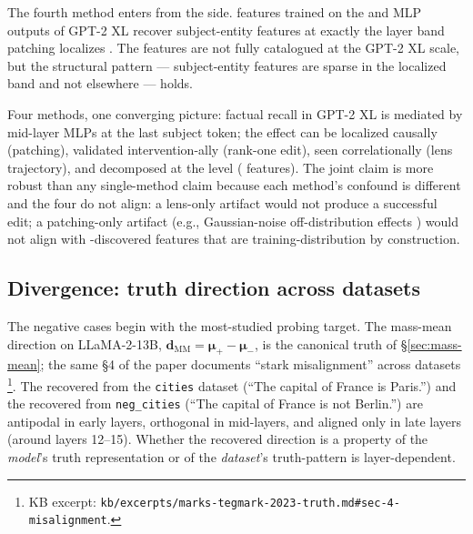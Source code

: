 The fourth method enters from the  side.  features trained on
the  and MLP outputs of GPT-2 XL recover
subject-entity features at exactly the layer band patching
localizes . The features are not fully
catalogued at the GPT-2 XL scale, but the structural pattern ---
subject-entity features are sparse in the localized band and not
elsewhere --- holds.

Four methods, one converging picture: factual recall in GPT-2 XL is
mediated by mid-layer MLPs at the last subject token; the effect
can be localized causally (patching), validated intervention-ally
(rank-one edit), seen correlationally (lens trajectory), and
decomposed at the  level ( features). The joint claim is
more robust than any single-method claim because each method's
confound is different and the four do not align: a lens-only
artifact would not produce a successful edit; a patching-only
artifact (e.g., Gaussian-noise off-distribution effects
\citep{zhang2023-apatching}) would not align with -discovered
features that are training-distribution by construction.

\subsection{Divergence: truth direction across datasets}
\label{sec:cross-truth}

The negative cases begin with the most-studied probing target. The
\citet{marks-tegmark-2023-truth} mass-mean direction on
LLaMA-2-13B, $\mathbf{d}_{\mathrm{MM}} = \boldsymbol{\mu}_+ -
\boldsymbol{\mu}_-$, is the canonical truth  of
\S\ref{sec:mass-mean}; the same \S 4 of the paper documents
``stark misalignment'' across datasets \citep[\S 4]{marks-tegmark-2023-truth}\footnote{KB
excerpt: \nolinkurl{kb/excerpts/marks-tegmark-2023-truth.md#sec-4-misalignment}.}.
The  recovered from the \texttt{cities} dataset
(``The capital of France is Paris.'') and the 
recovered from \texttt{neg\_cities} (``The capital of France is
not Berlin.'') are antipodal in early layers, orthogonal in
mid-layers, and aligned only in late layers (around layers
12--15). Whether the recovered direction is a property of the
\emph{model}'s truth representation or of the \emph{dataset}'s
truth-pattern is layer-dependent.

